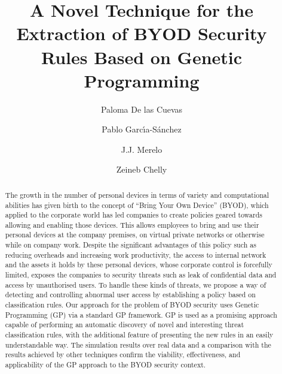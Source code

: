 \documentclass[a4paper,10pt,twocolumn,preprint,3p]{elsarticle}
\begin{document}
\begin{frontmatter}

\title{A Novel Technique for the Extraction of BYOD Security Rules Based on Genetic Programming}

\author[ugr]{Paloma De las Cuevas}
\author[ugr]{Pablo Garc\'{\i}a-S\'anchez}
\author[ugr]{J.J. Merelo}
\author[isgt]{Zeineb Chelly}

\address[ugr]{Department of Computer Architecture and Computer Technology, ETSIIT and CITIC \\
University of Granada, Granada, Spain. Tel: +34958241778. Fax: +34958248993}
\address[isgt]{LARODEC, Institut Sup\'erieur de Gestion de Tunis, Tunisia.}


\begin{abstract}
The growth in the number of personal devices in terms of variety and
computational %
abilities has given birth to the concept of ``Bring Your Own Device''
(BYOD), which applied to the corporate world has led companies to
create policies geared towards allowing and enabling those devices. %
This allows %
employees to bring and use their personal devices at
the company premises, on virtual private networks or otherwise while
on company work. Despite the significant advantages of this policy
such as reducing overheads and increasing work productivity, 
the
access to internal network and the assets it holds by these personal
devices, whose corporate control is forcefully limited, exposes the companies to
security threats such as leak of confidential data and access by
unauthorised users. %
To handle these kinds of threats, we propose a way of detecting and controlling abnormal user
access by establishing a policy based on classification rules. Our
approach for the problem of BYOD security uses Genetic Programming
(GP) via a standard GP framework. GP is used as a promising approach %
capable of performing an automatic discovery of novel and interesting
threat classification rules, with the additional feature of presenting
the new rules in an easily understandable way. %
The simulation results over real data and a
comparison with the results achieved by other techniques confirm the
viability, effectiveness, and applicability of the GP approach to the
BYOD security context.
\end{abstract}



\end{frontmatter}
\end{document}
